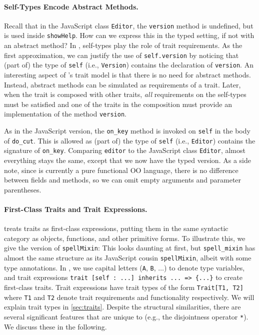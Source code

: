 \paragraph{Self-Types Encode Abstract Methods.}
Recall that in the JavaScript class \lstinline{Editor}, the \lstinline{version}
method is undefined, but is used inside \lstinline{showHelp}. How can we express
this in the typed setting, if not with an abstract method? In \name, self-types
play the role of trait requirements. As the first approximation, we
can justify the use of \lstinline{self.version} by noticing that (part of) the
type of \lstinline{self} (i.e., \lstinline{Version}) contains the declaration of
\lstinline{version}. An interesting aspect of \name's trait model is that there
is no need for abstract methods. Instead, abstract methods can be simulated as
requirements of a trait. Later, when the trait is composed with other
traits, \emph{all} requirements on the self-types must be
satisfied and one of the traits in the composition must provide an
implementation of the method \lstinline{version}.

As in the JavaScript version, the \lstinline{on_key} method is invoked on
\lstinline{self} in the body of \lstinline{do_cut}. This is allowed as (part of)
the type of \lstinline{self} (i.e., \lstinline{Editor}) contains the signature
of \lstinline{on_key}. Comparing \lstinline{editor} to the JavaScript class
\lstinline{Editor}, almost everything stays the same, except that we now have
the typed version. As a side note, since \name is currently a pure functional OO
language, there is no difference between fields and methods, so we can omit
empty arguments and parameter parentheses.

\paragraph{First-Class Traits and Trait Expressions.}

\name treats traits as first-class expressions, putting them in the same
syntactic category as objects, functions, and other primitive forms. To
illustrate this, we give the \name version of \lstinline{spellMixin}:
This looks daunting at first, but \lstinline{spell_mixin} has almost the same structure as
its JavaScript cousin \lstinline{spellMixin}, albeit with
some type annotations. In \name, we use capital letters (\lstinline{A}, \lstinline{B}, $\dots$) to denote type variables, and trait
expressions \lstinline$trait [self : ...] inherits ... => {...}$ to create
first-class traits. Trait expressions have trait
types of the form \lstinline{Trait[T1, T2]} where \lstinline{T1} and \lstinline{T2} denote trait requirements and functionality respectively.
We will explain trait types in \cref{sec:traits}. Despite the structural similarities, there are several significant
features that are unique to \name (e.g., the disjointness operator \lstinline{*}).
We discuss these in the following.



